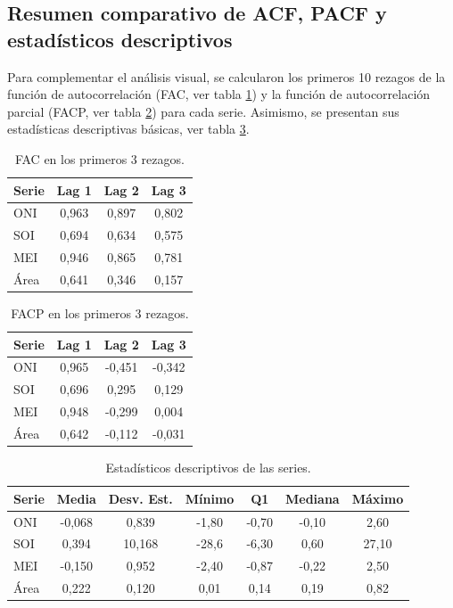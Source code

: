 \subsection{Resumen comparativo de ACF, PACF y estadísticos descriptivos}

Para complementar el análisis visual, se calcularon los primeros 10 rezagos de la función 
de autocorrelación (FAC, ver tabla \ref{tab:fac}) y la función de autocorrelación parcial (FACP, ver tabla \ref{tab:facp}) para cada serie. 
Asimismo, se presentan sus estadísticas descriptivas básicas, ver tabla \ref{tab:descriptivos}. 

\begin{table}[H]
    \centering
    \caption{FAC en los primeros 3 rezagos.}
    \label{tab:fac}
    \begin{tabular}{lccc}
        \toprule
        \textbf{Serie} & \textbf{Lag 1} & \textbf{Lag 2} & \textbf{Lag 3} \\
        \midrule
        ONI  & 0,963 & 0,897 & 0,802 \\
        SOI  & 0,694 & 0,634 & 0,575 \\
        MEI  & 0,946 & 0,865 & 0,781 \\
        Área & 0,641 & 0,346 & 0,157 \\
        \bottomrule
    \end{tabular}
\end{table}

\begin{table}[H]
    \centering
    \caption{FACP en los primeros 3 rezagos.}
    \label{tab:facp}
    \begin{tabular}{lccc}
        \toprule
        \textbf{Serie} & \textbf{Lag 1} & \textbf{Lag 2} & \textbf{Lag 3} \\
        \midrule
        ONI  & 0,965 & -0,451 & -0,342 \\
        SOI  & 0,696 &  0,295 &  0,129 \\
        MEI  & 0,948 & -0,299 &  0,004 \\
        Área & 0,642 & -0,112 & -0,031 \\
        \bottomrule
    \end{tabular}
\end{table}


\begin{table}[H]
    \centering
    \caption{Estadísticos descriptivos de las series.}
    \label{tab:descriptivos}
    \begin{tabular}{lcccccc}
        \toprule
        Serie & Media & Desv. Est. & Mínimo & Q1 & Mediana & Máximo \\
        \midrule
        ONI   & -0,068 & 0,839 & -1,80 & -0,70 & -0,10 &  2,60 \\
        SOI   &  0,394 & 10,168 & -28,6 & -6,30 &  0,60 & 27,10 \\
        MEI   & -0,150 & 0,952 & -2,40 & -0,87 & -0,22 &  2,50 \\
        Área  &  0,222 & 0,120 &  0,01 &  0,14 &  0,19 &  0,82 \\
        \bottomrule
    \end{tabular}
\end{table}



